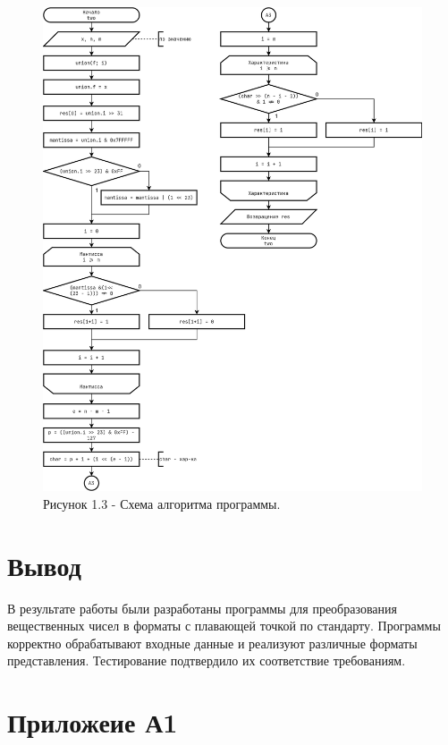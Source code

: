 \documentclass[oneside,a4paper,14pt]{extarticle}
\begin{document}
\begin{figure}[h!]
	\centering
    \includegraphics[height=0.9\textheight]{pics/5_flowchart_p3.png}
	\caption*{Рисунок 1.3 - Схема алгоритма программы.}
\end{figure}

\newpage
\section*{Вывод}
В результате работы были разработаны программы для преобразования
вещественных чисел в форматы с плавающей точкой по стандарту. Программы
корректно обрабатывают входные данные и реализуют различные форматы
представления. Тестирование подтвердило их соответствие требованиям.\\

\section*{Приложеие А1}
\end{document}
